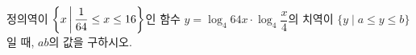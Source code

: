 정의역이 $\left\{x \mkern3mu \middle|\mkern3mu  \dfrac{1}{64}\le x\le 16\right\}$인 함수 $y=\log_4 64x \cdot \log_4 \dfrac{x}{4}$의 치역이 $\{y \mid a\le y\le b\}$일 때, $ab$의 값을 구하시오.
